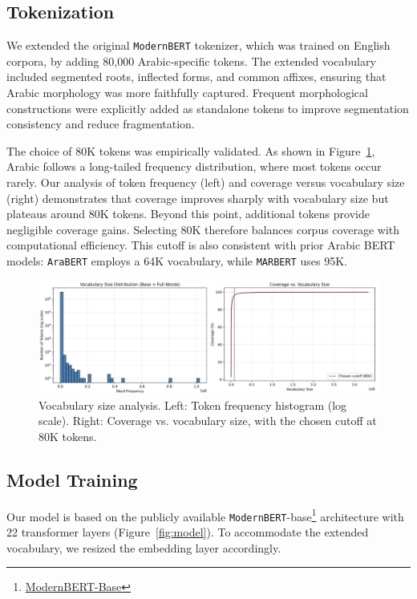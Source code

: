 \documentclass[10pt, a4paper]{article}
\begin{document}
\subsection{Tokenization}

We extended the original \texttt{ModernBERT} tokenizer, which was trained on English corpora, by adding 80,000 Arabic-specific tokens. The extended vocabulary included segmented roots, inflected forms, and common affixes, ensuring that Arabic morphology was more faithfully captured. Frequent morphological constructions were explicitly added as standalone tokens to improve segmentation consistency and reduce fragmentation.  

The choice of 80K tokens was empirically validated. As shown in Figure~\ref{fig:vocab}, Arabic follows a long-tailed frequency distribution, where most tokens occur rarely. Our analysis of token frequency (left) and coverage versus vocabulary size (right) demonstrates that coverage improves sharply with vocabulary size but plateaus around 80K tokens. Beyond this point, additional tokens provide negligible coverage gains. Selecting 80K therefore balances corpus coverage with computational efficiency. This cutoff is also consistent with prior Arabic BERT models: \texttt{AraBERT} employs a 64K vocabulary, while \texttt{MARBERT} uses 95K.  

\begin{figure}[h]
\centering
\includegraphics[width=\linewidth]{80k.jpg}
\caption{Vocabulary size analysis. Left: Token frequency histogram (log scale). Right: Coverage vs. vocabulary size, with the chosen cutoff at 80K tokens.}
\label{fig:vocab}
\end{figure}

\subsection{Model Training}
Our model is based on the publicly available \texttt{ModernBERT}-base\footnote{\href{https://huggingface.co/answerdotai/ModernBERT-base}{ModernBERT-Base}} architecture with 22 transformer layers (Figure~\ref{fig:model}). To accommodate the extended vocabulary, we resized the embedding layer accordingly.  
\end{document}
